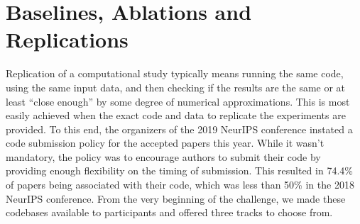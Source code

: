\begin{table}[]
\centering
{}
\caption{Participation in the Reproducibility Challenge. Source for number of papers accepted and acceptance rates: \href{https://github.com/lixin4ever/Conference-Acceptance-Rate}{https://github.com/lixin4ever/Conference-Acceptance-Rate}
}
\label{tab:stats}
\end{table}

\section{Baselines, Ablations and Replications}

Replication of a computational study typically means running the same code, using the same input data, and then checking if the results are the same or at least “close enough” by some degree of numerical approximations. This is most easily achieved when the exact code and data to replicate the experiments are provided. To this end, the organizers of the 2019 NeurIPS conference instated a code submission policy for the accepted papers this year. While it wasn’t mandatory, the policy was to encourage authors to submit their code by providing enough flexibility on the timing of submission. This resulted in 74.4\% of papers being associated with their code, which was less than 50\% in the 2018 NeurIPS conference. From the very beginning of the challenge, we made these codebases available to participants and offered three tracks to choose from. 

